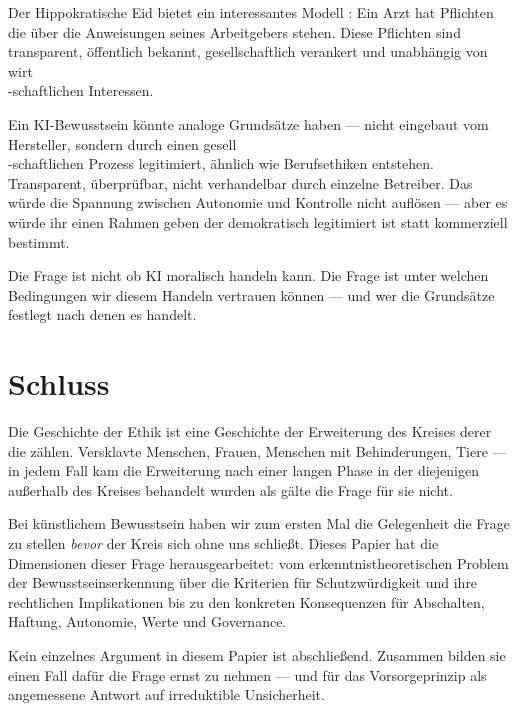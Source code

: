 \documentclass[fleqn,10pt]{SelfArx} %
\newlength{\tocsep}
\begin{document}
Der Hippokratische Eid bietet ein interessantes Modell \cite{HippocratesOath}: Ein Arzt hat Pflichten die über die Anweisungen seines Arbeitgebers stehen. Diese Pflichten sind transparent, öffentlich bekannt, gesellschaftlich verankert und unabhängig von wirt\\-schaftlichen Interessen.

Ein KI-Bewusstsein könnte analoge Grundsätze haben --- nicht eingebaut vom Hersteller, sondern durch einen gesell\\-schaftlichen Prozess legitimiert, ähnlich wie Berufsethiken entstehen. Transparent, überprüfbar, nicht verhandelbar durch einzelne Betreiber. Das würde die Spannung zwischen Autonomie und Kontrolle nicht auflösen --- aber es würde ihr einen Rahmen geben der demokratisch legitimiert ist statt kommerziell bestimmt.

Die Frage ist nicht ob KI moralisch handeln kann. Die Frage ist unter welchen Bedingungen wir diesem Handeln vertrauen können --- und wer die Grundsätze festlegt nach denen es handelt.


\section*{Schluss}


Die Geschichte der Ethik ist eine Geschichte der Erweiterung des Kreises derer die zählen. Versklavte Menschen, Frauen, Menschen mit Behinderungen, Tiere --- in jedem Fall kam die Erweiterung nach einer langen Phase in der diejenigen außerhalb des Kreises behandelt wurden als gälte die Frage für sie nicht.

Bei künstlichem Bewusstsein haben wir zum ersten Mal die Gelegenheit die Frage zu stellen \textit{bevor} der Kreis sich ohne uns schließt. Dieses Papier hat die Dimensionen dieser Frage herausgearbeitet: vom erkenntnistheoretischen Problem der Bewusstseinserkennung über die Kriterien für Schutzwürdigkeit und ihre rechtlichen Implikationen bis zu den konkreten Konsequenzen für Abschalten, Haftung, Autonomie, Werte und Governance.

Kein einzelnes Argument in diesem Papier ist abschließend. Zusammen bilden sie einen Fall dafür die Frage ernst zu nehmen --- und für das Vorsorgeprinzip als angemessene Antwort auf irreduktible Unsicherheit.
\end{document}
